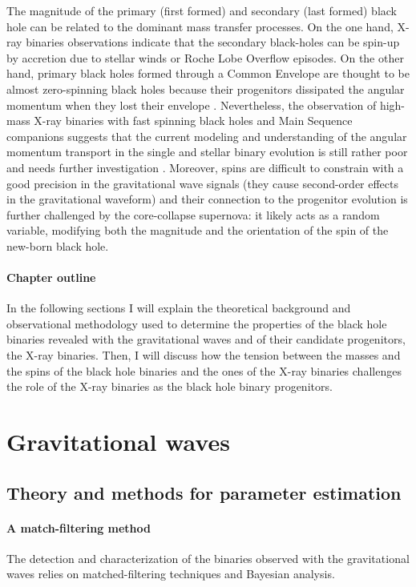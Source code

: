 \documentclass[a4paper,titlepage]{book}     	%
\begin{document}
The magnitude of the primary (first formed) and secondary (last formed) black hole can be related to the dominant mass transfer processes. On the one hand, X-ray binaries observations indicate that the secondary black-holes can be spin-up by accretion due to stellar winds or Roche Lobe Overflow episodes. On the other hand, primary black holes formed through a Common Envelope are thought to be almost zero-spinning black holes because their progenitors dissipated the angular momentum when they lost their envelope \cite{spinBH_Qin2018}.  Nevertheless, the observation of high-mass X-ray binaries with fast spinning black holes and Main Sequence companions suggests that the current modeling and understanding of the angular momentum transport in the single and stellar binary evolution is still rather poor and needs further investigation \cite{spinfastBH_Qin2019}. Moreover, spins are difficult to constrain with a good precision in the gravitational wave signals (they cause second-order effects in the gravitational waveform) and their connection to the progenitor evolution is further challenged by the core-collapse supernova: it likely acts as a random variable, modifying both the magnitude and the orientation of the spin of the new-born black hole. \cite{GWTC-3_interpretation}

\paragraph{Chapter outline}
In the following sections I will explain the theoretical background and observational methodology used to determine the properties of the black hole binaries revealed with the gravitational waves and of their candidate progenitors, the X-ray binaries. Then, I will discuss how the tension between the masses and the spins of the  black hole binaries and the ones of the X-ray binaries challenges the role of the X-ray binaries as the black hole binary progenitors.


\section{Gravitational waves}
\subsection{Theory and methods for parameter estimation}\label{subsec:GWtheorymethod}
\paragraph{A match-filtering method} The detection and characterization of the binaries observed with the gravitational waves relies on matched-filtering techniques and Bayesian analysis. 
\end{document}
